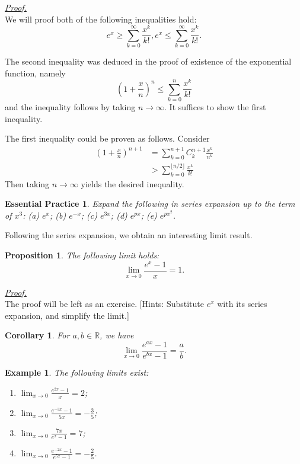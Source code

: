 \documentclass[12pt]{article}
\newtheorem*{corollary}{Corollary}
\newtheorem*{proposition}{Proposition}
\newtheorem*{example}{Example}
\newtheorem{exercise}{Essential Practice}[section]
\renewenvironment{proof}[1][Proof]{\begin{snugshade*} \underline{\textit{{#1}.}}\\}{\hfill \qedsymbol \end{snugshade*}}
\begin{document}
    \begin{proof}
        We will proof both of the following inequalities hold:\[e^x \geq \sum_{k=0}^{\infty}\frac{x^k}{k!}, e^x\leq \sum_{k=0}^{\infty}\frac{x^k}{k!}.\]

        The second inequality was deduced in the proof of existence of the exponential function, namely \[(1+\frac{x}{n})^n\leq \sum_{k=0}^{n}\frac{x^k}{k!}\] and the inequality follows by taking $n\to \infty$. It suffices to show the first inequality.

        The first inequality could be proven as follows. Consider \begin{align*}
            (1+\frac{x}{n})^{n+1}&=\sum_{k=0}^{n+1}C_k^{n+1}\frac{x^k}{n^k}\\
            &>\sum_{k=0}^{\lfloor n/2 \rfloor}\frac{x^k}{k!}
        \end{align*} 
        Then taking $n\to\infty$ yields the desired inequality.
    \end{proof}

    \begin{exercise}
        Expand the following in series expansion up to the term of $x^3$: (a) $e^x$; (b) $e^{-x}$; (c) $e^{3x}$; (d) $e^{px}$; (e) $e^{px^2}$.
    \end{exercise}

    Following the series expansion, we obtain an interesting limit result.

    \begin{proposition}
        The following limit holds: \[\lim_{x\to 0}\frac{e^x-1}{x}=1.\]
    \end{proposition}

    \begin{proof}
        The proof will be left as an exercise. [Hints: Substitute $e^x$ with its series expansion, and simplify the limit.]
    \end{proof}

    \begin{corollary}
        For $a,b\in\mathbb{R}$, we have \[\lim_{x\to 0}\frac{e^{ax}-1}{e^{bx}-1}=\frac{a}{b}.\]
    \end{corollary}

    \begin{example}
        The following limits exist:\begin{enumerate}
            \item $\displaystyle\lim_{x\to 0}\frac{e^{2x}-1}{x}=2$;
            \item $\displaystyle\lim_{x\to 0}\frac{e^{-3x}-1}{5x}=-\frac{3}{5}$;
            \item $\displaystyle\lim_{x\to 0}\frac{7x}{e^{x}-1}=7$;
            \item $\displaystyle\lim_{x\to 0}\frac{e^{-2x}-1}{e^{5x}-1}=-\frac{2}{5}$.
        \end{enumerate}
    \end{example}
\end{document}
